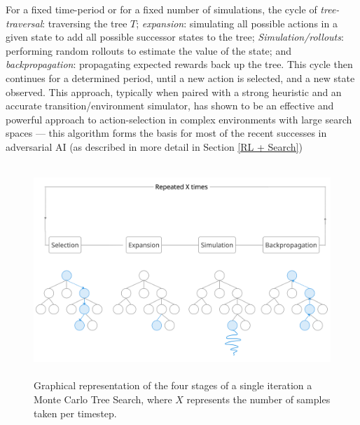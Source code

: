 \newline \newline
For a fixed time-period or for a fixed number of simulations, the cycle of \textit{tree-traversal}: traversing the tree $T$; \textit{expansion}: simulating all possible actions in a given state to add all possible successor states to the tree; \textit{Simulation/rollouts}: performing random rollouts to estimate the value of the state; and \textit{backpropagation}: propagating expected rewards back up the tree. This cycle then continues for a determined period, until a new action is selected, and a new state observed. 
\newline \newline
This approach, typically when paired with a strong heuristic and an accurate transition/environment simulator, has shown to be an effective and powerful approach to action-selection in complex environments with large search spaces --- this algorithm forms the basis for most of the recent successes in adversarial AI (as described in more detail in Section \ref{RL + Search}) 

\begin{figure}
    \caption{Graphical representation of the four stages of a single iteration a Monte Carlo Tree Search, where $X$ represents the number of samples taken per timestep.}
    \includegraphics[width = \textwidth, height = 8cm]{Figures/MonteCarlo.png}
    \centering
\end{figure}

